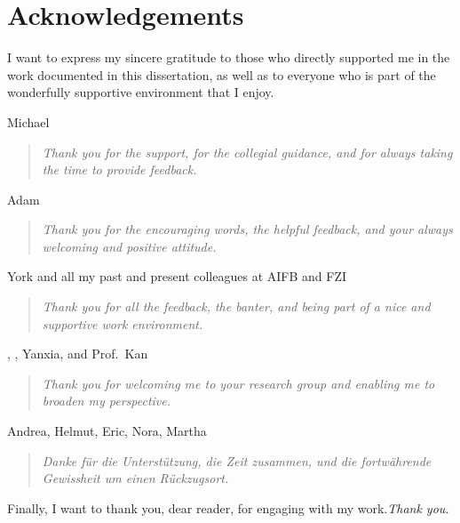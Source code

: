 \chapter{Acknowledgements}

I want to express my sincere gratitude to those who directly supported me in the work documented in this dissertation, as well as to everyone who is part of the wonderfully supportive environment that I enjoy.
\vspace{1.5em}

Michael
\begin{quote}
\emph{Thank you for the support, for the collegial guidance, and for always taking the time to provide feedback.}
\end{quote}

Adam
\begin{quote}
\emph{Thank you for the encouraging words, the helpful feedback, and your always welcoming and positive attitude.}
\end{quote}

York and all my past and present colleagues at AIFB and FZI
\begin{quote}
\emph{Thank you for all the feedback, the banter, and being part of a nice and supportive work environment.}
\end{quote}

, , Yanxia, and Prof.\ Kan
\begin{quote}
\emph{Thank you for welcoming me to your research group and enabling me to broaden my perspective.}
\end{quote}

Andrea, Helmut, Eric, Nora, Martha
\begin{quote}
\emph{Danke für die Unterstützung, die Zeit zusammen, und die fortwährende Gewissheit um einen Rückzugsort.}
\end{quote}

\begin{quote}
\end{quote}

\vspace{1.5em}
Finally, I want to thank you, dear reader, for engaging with my work.\hfill\emph{Thank you.}

